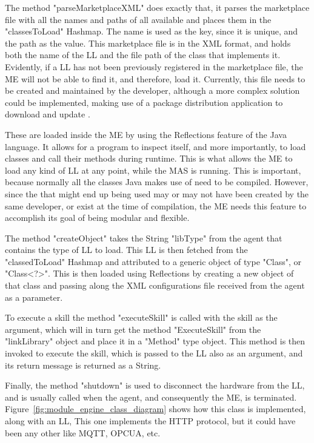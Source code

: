 The method "parseMarketplaceXML" does exactly that, it parses the marketplace file with all the names and paths of all available  and places them in the "classesToLoad" Hashmap. The name is used as the key, since it is unique, and the path as the value. This marketplace file is in the \acrshort{XML} format, and holds both the name of the \acrshort{LL} and the file path of the class that implements it. Evidently, if a \acrlong{LL} has not been previously registered in the marketplace file, the \acrlong{ME} will not be able to find it, and therefore, load it. Currently, this file needs to be created and maintained by the developer, although a more complex solution could be implemented, making use of a package distribution application to download and update .

These  are loaded inside the \acrshort{ME} by using the Reflections feature of the Java language. It allows for a program to inspect itself, and more importantly, to load classes and call their methods during runtime. This is what allows the \acrshort{ME} to load any kind of \acrshort{LL} at any point, while the \acrshort{MAS} is running. This is important, because normally all the classes Java makes use of need to be compiled. However, since the  that might end up being used may or may not have been created by the same developer, or exist at the time of compilation, the \acrshort{ME} needs this feature to accomplish its goal of being modular and flexible.

The method "createObject" takes the String "libType" from the agent that contains the type of \acrshort{LL} to load. This \acrshort{LL} is then fetched from the "classedToLoad" Hashmap and attributed to a generic object of type "Class", or "Class<?>". This is then loaded using Reflections by creating a new object of that class and passing along the \acrshort{XML} configurations file received from the agent as a parameter.

To execute a skill the method "executeSkill" is called with the skill as the argument, which will in turn get the method "ExecuteSkill" from the "linkLibrary" object and place it in a "Method" type object. This method is then invoked to execute the skill, which is passed to the \acrshort{LL} also as an argument, and its return message is returned as a String.

Finally, the method "shutdown" is used to disconnect the hardware from the \acrlong{LL}, and is usually called when the agent, and consequently the \acrshort{ME}, is terminated. Figure~\ref{fig:module_engine_class_diagram} shows how this class is implemented, along with an \acrshort{LL}, This one implements the \acrshort{HTTP} protocol, but it could have been any other like \acrshort{MQTT}, \acrshort{OPCUA}, etc.\\


